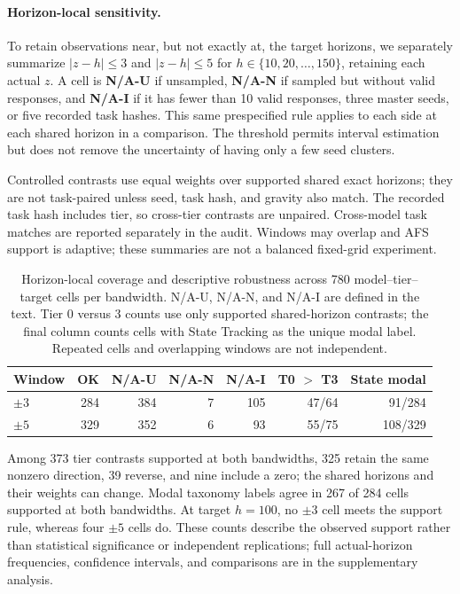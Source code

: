\documentclass{article}
\begin{document}
\paragraph{Horizon-local sensitivity.}
To retain observations near, but not exactly at, the target horizons, we
separately summarize $|z-h|\leq 3$ and $|z-h|\leq 5$ for
$h\in\{10,20,\ldots,150\}$, retaining each actual $z$. A cell is
\textbf{N/A-U} if unsampled, \textbf{N/A-N} if sampled but without valid
responses, and \textbf{N/A-I} if it has fewer than 10 valid responses, three
master seeds, or five recorded task hashes. This same prespecified rule applies
to each side at each shared horizon in a comparison. The threshold permits
interval estimation but does not remove the uncertainty of having only a few
seed clusters.

Controlled contrasts use equal weights over supported shared exact horizons;
they are not task-paired unless seed, task hash, and gravity also match.
The recorded task hash includes tier, so cross-tier contrasts are unpaired.
Cross-model task matches are reported separately in the audit. Windows may
overlap and AFS support is adaptive; these summaries are not a balanced
fixed-grid experiment.

\begin{table}[H]
\centering
\caption{Horizon-local coverage and descriptive robustness across 780 model--tier--target cells per bandwidth. N/A-U, N/A-N, and N/A-I are defined in the text. Tier 0 versus 3 counts use only supported shared-horizon contrasts; the final column counts cells with State Tracking as the unique modal label. Repeated cells and overlapping windows are not independent.}
\label{tab:horizon_local_sensitivity}
\scriptsize
\begin{tabular}{lrrrrrr}
\toprule
Window & OK & N/A-U & N/A-N & N/A-I & T0 $>$ T3 & State modal \\
\midrule
$\pm3$ & 284 & 384 & 7 & 105 & 47/64 & 91/284 \\
$\pm5$ & 329 & 352 & 6 & 93 & 55/75 & 108/329 \\
\bottomrule
\end{tabular}
\end{table}

Among 373 tier contrasts supported at both bandwidths, 325 retain the same
nonzero direction, 39 reverse, and nine include a zero; the shared horizons
and their weights can change. Modal taxonomy labels agree in 267 of 284 cells
supported at both bandwidths. At target $h=100$, no $\pm3$ cell meets the
support rule, whereas four $\pm5$ cells do. These counts describe the observed
support rather than statistical significance or independent replications; full
actual-horizon frequencies, confidence intervals, and comparisons are in the
supplementary analysis.
\end{document}

